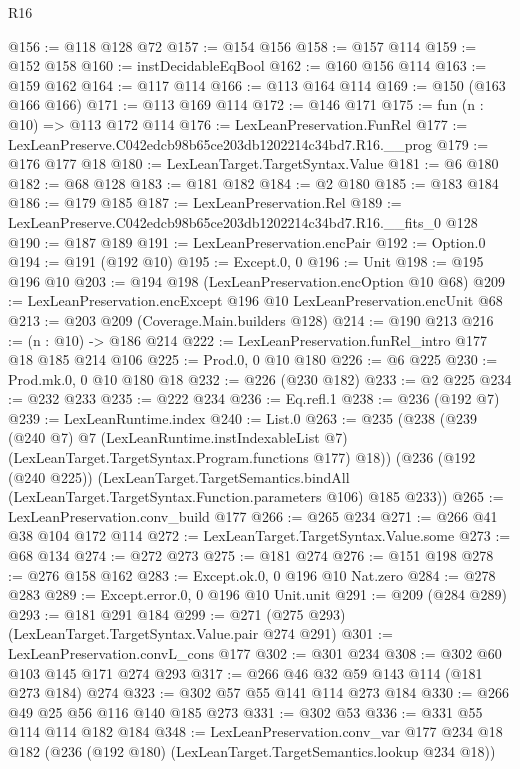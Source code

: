 \begin{lexlean}{R16}
\begin{coremodule}
@156 := @118 @128 @72
@157 := @154 @156
@158 := @157 @114
@159 := @152 @158
@160 := instDecidableEqBool
@162 := @160 @156 @114
@163 := @159 @162
@164 := @117 @114
@166 := @113 @164 @114
@169 := @150 (@163 @166 @166)
@171 := @113 @169 @114
@172 := @146 @171
@175 := fun (n : @10) => @113 @172 @114
@176 := LexLeanPreservation.FunRel
@177 := LexLeanPreserve.C042edcb98b65ce203db1202214c34bd7.R16.__prog
@179 := @176 @177 @18
@180 := LexLeanTarget.TargetSyntax.Value
@181 := @6 @180
@182 := @68 @128
@183 := @181 @182
@184 := @2 @180
@185 := @183 @184
@186 := @179 @185
@187 := LexLeanPreservation.Rel
@189 := LexLeanPreserve.C042edcb98b65ce203db1202214c34bd7.R16.__fits_0 @128
@190 := @187 @189
@191 := LexLeanPreservation.encPair
@192 := Option.{0}
@194 := @191 (@192 @10)
@195 := Except.{0, 0}
@196 := Unit
@198 := @195 @196 @10
@203 := @194 @198 (LexLeanPreservation.encOption @10 @68)
@209 := LexLeanPreservation.encExcept @196 @10 LexLeanPreservation.encUnit @68
@213 := @203 @209 (Coverage.Main.builders @128)
@214 := @190 @213
@216 := (n : @10) -> @186 @214
@222 := LexLeanPreservation.funRel_intro @177 @18 @185 @214 @106
@225 := Prod.{0, 0} @10 @180
@226 := @6 @225
@230 := Prod.mk.{0, 0} @10 @180 @18
@232 := @226 (@230 @182)
@233 := @2 @225
@234 := @232 @233
@235 := @222 @234
@236 := Eq.refl.{1}
@238 := @236 (@192 @7)
@239 := LexLeanRuntime.index
@240 := List.{0}
@263 := @235
    (@238
      (@239
        (@240 @7)
        @7
        (LexLeanRuntime.instIndexableList @7)
        (LexLeanTarget.TargetSyntax.Program.functions @177)
        @18))
    (@236
      (@192 (@240 @225))
      (LexLeanTarget.TargetSemantics.bindAll
        (LexLeanTarget.TargetSyntax.Function.parameters @106)
        @185
        @233))
@265 := LexLeanPreservation.conv_build @177
@266 := @265 @234
@271 := @266 @41 @38 @104 @172 @114
@272 := LexLeanTarget.TargetSyntax.Value.some
@273 := @68 @134
@274 := @272 @273
@275 := @181 @274
@276 := @151 @198
@278 := @276 @158 @162
@283 := Except.ok.{0, 0} @196 @10 Nat.zero
@284 := @278 @283
@289 := Except.error.{0, 0} @196 @10 Unit.unit
@291 := @209 (@284 @289)
@293 := @181 @291 @184
@299 := @271 (@275 @293) (LexLeanTarget.TargetSyntax.Value.pair @274 @291)
@301 := LexLeanPreservation.convL_cons @177
@302 := @301 @234
@308 := @302 @60 @103 @145 @171 @274 @293
@317 := @266 @46 @32 @59 @143 @114 (@181 @273 @184) @274
@323 := @302 @57 @55 @141 @114 @273 @184
@330 := @266 @49 @25 @56 @116 @140 @185 @273
@331 := @302 @53
@336 := @331 @55 @114 @114 @182 @184
@348 := LexLeanPreservation.conv_var
    @177
    @234
    @18
    @182
    (@236 (@192 @180) (LexLeanTarget.TargetSemantics.lookup @234 @18))

\end{coremodule}
\end{lexlean}
